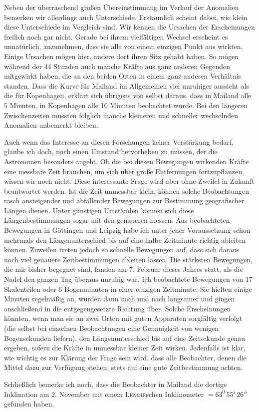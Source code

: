 Neben der überraschend großen Übereinstimmung im Verlauf der Anomalien bemerken wir allerdings auch Unterschiede. Erstaunlich scheint dabei, wie klein diese Unterschiede im Vergleich sind. Wir kennen die Ursachen der Erscheinungen freilich noch gar nicht. Gerade bei ihrem vielfältigen Wechsel erscheint es unnatürlich, anzunehmen, dass sie alle von einem einzigen Punkt aus wirkten. Einige Ursachen mögen hier, andere dort ihren Sitz gehabt haben. So mögen während der 44 Stunden auch manche Kräfte aus ganz anderen Gegenden mitgewirkt haben, die an den beiden Orten in einem ganz anderen Verhältnis standen. Dass die Kurve für Mailand im Allgemeinen viel unruhiger aussieht als die für Kopenhagen, erklärt sich übrigens von selbst daraus, dass in Mailand alle 5 Minuten, in Kopenhagen alle 10 Minuten beobachtet wurde. Bei den längeren Zwischenzeiten mussten folglich manche kleineren und schneller wechselnden Anomalien unbemerkt bleiben.

Auch wenn das Interesse an diesen Forschungen keiner Verstärkung bedarf, glaube ich doch, noch einen Umstand hervorheben zu müssen, der die Astronomen besonders angeht. Ob die bei diesen Bewegungen wirkenden Kräfte eine messbare Zeit brauchen, um sich über große Entfernungen fortzupflanzen, wissen wir noch nicht. Diese interessante Frage wird aber ohne Zweifel in
Zukunft beantwortet werden. Ist die Zeit unmessbar klein, können solche Beobachtungen rasch ansteigender und abfallender Bewegungen zur Bestimmung geografischer Längen dienen. Unter günstigen Umständen können sich diese Längenbestimmungen sogar mit den genaueren messen. Aus beobachteten Bewegungen in Göttingen und Leipzig habe ich unter jener Voraussetzung schon mehrmals den Längenunterschied bis auf eine halbe Zeitminute richtig ableiten können. Zuweilen treten jedoch so schnelle Bewegungen auf, dass sich daraus noch viel genauere Zeitbestimmungen ableiten lassen. Die stärksten Bewegungen, die mir bisher begegnet sind, fanden am 7. Februar dieses Jahres statt, als die Nadel den ganzen Tag überaus unruhig war. Ich beobachtete Bewegungen von 17 Skalenteilen oder 6 Bogenminuten in einer einzigen Zeitminute. Sie hielten einige Minuten regelmäßig an, wurden dann nach und nach langsamer und gingen anschließend in die entgegengesetzte Richtung über. Solche Erscheinungen könnten, wenn man sie an zwei Orten mit guten Apparaten sorgfältig verfolgt (die selbst bei einzelnen Beobachtungen eine Genauigkeit von wenigen Bogensekunden liefern), den Längenunterschied bis auf eine Zeitsekunde genau ergeben, sofern die Kräfte in unmessbar kleiner Zeit wirken. Jedenfalls ist klar, wie wichtig es zur Klärung der Frage sein wird, dass alle Beobachter, denen die Mittel dazu zur Verfügung stehen, stets auf eine gute Zeitbestimmung achten.

Schließlich bemerke ich noch, dass die Beobachter in Mailand die dortige Inklination am 2. November mit einem \textsc{Lenoir}schen Inklinometer $=63^0\,55'\,26''$ gefunden haben.

